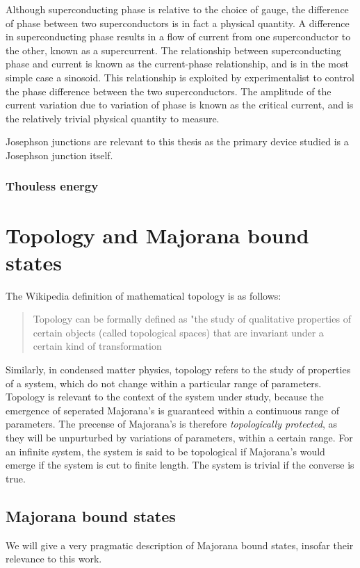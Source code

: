 			Although superconducting phase is relative to the choice of gauge, the difference of phase between two superconductors is in fact a physical quantity.
			A difference in superconducting phase results in a flow of current from one superconductor to the other, known as a supercurrent.
			The relationship between superconducting phase and current is known as the current-phase relationship, and is in the most simple case a sinosoid.
			This relationship is exploited by experimentalist to control the phase difference between the two superconductors.
			The amplitude of the current variation due to variation of phase is known as the critical current, and is the relatively trivial physical quantity to measure.
			
			Josephson junctions are relevant to this thesis as the primary device studied is a Josephson junction itself.

		\subsubsection{Thouless energy}


\section{Topology and Majorana bound states}

	The Wikipedia definition of mathematical topology is as follows:
	
	\begin{quote}Topology can be formally defined as "the study of qualitative properties of certain objects (called topological spaces) that are invariant under a certain kind of transformation
	\cite{noauthor_topology_2018}
	\end{quote}

	Similarly, in condensed matter physics, topology refers to the study of properties of a system, which do not change within a particular range of parameters.
	Topology is relevant to the context of the system under study, because the emergence of seperated Majorana's is guaranteed within a continuous range of parameters.
	The precense of Majorana's is therefore \emph{topologically protected}, as they will be unpurturbed by variations of parameters, within a certain range.
	For an infinite system, the system is said to be topological if Majorana's would emerge if the system is cut to finite length.
	The system is trivial if the converse is true.

	\subsection{Majorana bound states}
		We will give a very pragmatic description of Majorana bound states, insofar their relevance to this work.

